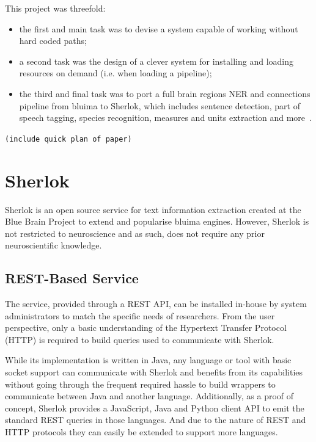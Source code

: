 \documentclass{article}
\newcommand{\TODO}[1]{\texttt{\textcolor{YellowOrange}{(#1)}}} %
\begin{document}
This project was threefold:

\begin{itemize}[label=]
    \item the first and main task was to devise a system capable of working without hard coded
        paths;
    \item a second task was the design of a clever system for installing and loading resources on
        demand (i.e. when loading a pipeline);
    \item the third and final task was to port a full brain regions NER and connections pipeline
        from bluima to Sherlok, which includes sentence detection, part of speech tagging, species
        recognition, measures and units extraction and more~\cite{bluima_2013}.
\end{itemize}

\TODO{include quick plan of paper}

\section{Sherlok}

Sherlok is an open source service for text information extraction created at the Blue Brain Project
to extend and popularise bluima engines. However, Sherlok is not restricted to neuroscience and as
such, does not require any prior neuroscientific knowledge.

\subsection{REST-Based Service}

The service, provided through a REST API, can be installed in-house by system administrators to
match the specific needs of researchers. From the user perspective, only a basic understanding of
the Hypertext Transfer Protocol (HTTP) is required to build queries used to communicate with
Sherlok.

While its implementation is written in Java, any language or tool with basic socket support can
communicate with Sherlok and benefits from its capabilities without going through the frequent
required hassle to build wrappers to communicate between Java and another language. Additionally,
as a proof of concept, Sherlok provides a JavaScript, Java and Python client API to emit the
standard REST queries in those languages. And due to the nature of REST and HTTP protocols they can
easily be extended to support more languages.
\end{document}
